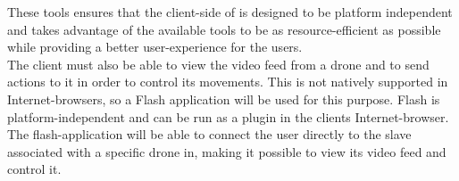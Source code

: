These tools ensures that the client-side of \projectname{} is designed to be platform independent and takes advantage of the available tools to be as resource-efficient as possible while providing a better user-experience for the users. \\

The client must also be able to view the video feed from a drone and to send actions to it in order to control its movements. 
This is not natively supported in Internet-browsers, so a Flash application will be used for this purpose. 
Flash is platform-independent and can be run as a plugin in the clients Internet-browser.
The flash-application will be able to connect the user directly to the slave associated with a specific drone in, making it possible to view its video feed and control it.

